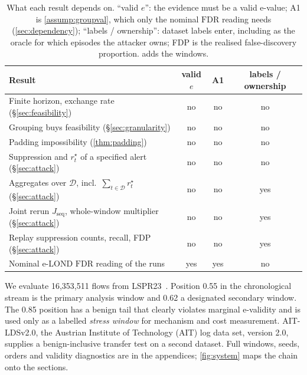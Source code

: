 \documentclass[conference]{IEEEtran}
\newcommand{\FDR}{\mathrm{FDR}}
\begin{document}
\begin{table}[!t]
\centering
\caption{What each result depends on. ``valid $e$'': the evidence must be a valid e-value; A1 is
\cref{assump:groupval}, which only the nominal $\FDR$ reading needs (\cref{sec:dependency}); ``labels /
ownership'': dataset labels enter, including as the oracle for which episodes the attacker owns; FDP is
the realised false-discovery proportion.  adds the windows.}
\label{tab:deps}
\footnotesize
\setlength{\tabcolsep}{4pt}
\begin{tabular}{@{}lccc@{}}
\toprule
Result & valid $e$ & A1 & labels / ownership \\
\midrule
Finite horizon, exchange rate (\S\ref{sec:feasibility}) & no & no & no \\
Grouping buys feasibility (\S\ref{sec:granularity}) & no & no & no \\
Padding impossibility (\cref{thm:padding}) & no & no & no \\
Suppression and $r^{\star}_t$ of a specified alert (\S\ref{sec:attack}) & no & no & no \\
Aggregates over $\mathcal D$, incl.\ $\sum_{t\in\mathcal D} r^{\star}_t$ (\S\ref{sec:attack}) & no & no & yes \\
Joint rerun $J_{\mathrm{seq}}$, whole-window multiplier (\S\ref{sec:attack}) & no & no & yes \\
Replay suppression counts, recall, FDP (\S\ref{sec:attack}) & no & no & yes \\
Nominal e-LOND $\FDR$ reading of the runs & yes & yes & no \\
\bottomrule
\end{tabular}
\end{table}

We evaluate 16,353,511 flows from LSPR23~\cite{lspr23}. Position 0.55 in the chronological
stream is the primary analysis window and 0.62 a designated secondary window. The 0.85 position has a
benign tail that clearly violates marginal e-validity and is used only as a labelled \emph{stress
window} for mechanism and cost measurement. AIT-LDSv2.0, the Austrian Institute of
Technology (AIT) log data set, version 2.0, supplies a benign-inclusive transfer test on a second dataset. Full windows, seeds, orders and validity diagnostics are in the
appendices; \cref{fig:system} maps the chain onto the sections.
\end{document}
